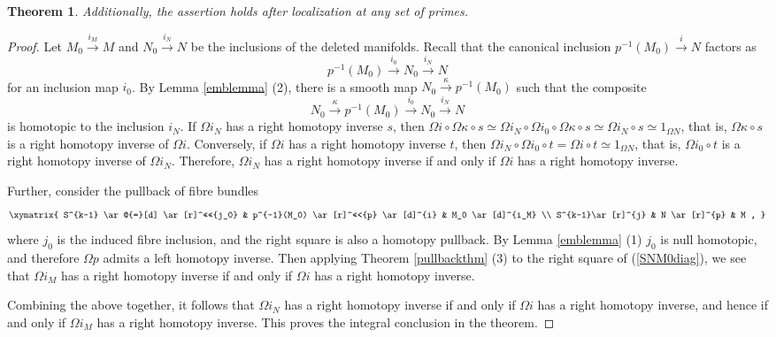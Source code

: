 \documentclass[a4]{amsart}
\newtheorem{theorem}{Theorem}[section]
\theoremstyle{definition}
\begin{document}
\begin{sloppypar}
\begin{theorem}
Additionally, the assertion holds after localization at any set of primes.
\end{theorem}
\begin{proof}
Let $M_0\stackrel{i_M}{\longrightarrow} M$ and $N_0\stackrel{i_N}{\longrightarrow} N$ be the inclusions of the deleted manifolds. Recall that the canonical inclusion $p^{-1}(M_0)\stackrel{i}{\longrightarrow} N$ factors as
\[
p^{-1}(M_0)\stackrel{i_0}{\longrightarrow} N_0 \stackrel{i_N}{\longrightarrow} N
\]
for an inclusion map $i_0$. 
By Lemma \ref{emblemma} (2), there is a smooth map $N_0\stackrel{\kappa}{\longrightarrow} p^{-1}(M_0)$ such that the composite 
\[
N_0\stackrel{\kappa}{\longrightarrow} p^{-1}(M_0)\stackrel{i_0}{\longrightarrow} N_0 \stackrel{i_N}{\longrightarrow} N
\] 
is homotopic to the inclusion $i_N$. If $\Omega i_N$ has a right homotopy inverse $s$, then $\Omega i\circ \Omega  \kappa\circ s\simeq \Omega i_N\circ \Omega i_0 \circ \Omega \kappa\circ s\simeq \Omega i_N\circ s\simeq 1_{\Omega N}$, that is, $\Omega\kappa\circ s$ is a right homotopy inverse of $\Omega i$. Conversely, if $\Omega i$ has a right homotopy inverse $t$, then $\Omega i_N\circ \Omega i_0 \circ t= \Omega i\circ t\simeq 1_{\Omega N}$, that is, $\Omega i_0\circ t$ is a right homotopy inverse of $\Omega i_N$. Therefore, $\Omega i_N$ has a right homotopy inverse if and only if $\Omega i$ has a right homotopy inverse. 


Further, consider the pullback of fibre bundles
\begin{equation}\label{SNM0diag}
\begin{aligned}
\xymatrix{
S^{k-1} \ar@{=}[d] \ar[r]^<<<<{j_0} & p^{-1}(M_0) \ar[r]^<<<{p} \ar[d]^{i} & M_0 \ar[d]^{i_M} \\ 
S^{k-1}\ar[r]^{j}                   &            N               \ar[r]^{p}    &  M ,                
}
\end{aligned}
\end{equation}
where $j_0$ is the induced fibre inclusion, and the right square is also a homotopy pullback. By Lemma \ref{emblemma} (1) $j_0$ is null homotopic, and therefore $\Omega p$ admits a left homotopy inverse. Then applying Theorem \ref{pullbackthm} (3) to the right square of (\ref{SNM0diag}), we see that $\Omega i_M$ has a right homotopy inverse if and only if $\Omega i$ has a right homotopy inverse.

Combining the above together, it follows that $\Omega i_N$ has a right homotopy inverse if and only if $\Omega i$ has a right homotopy inverse, and hence if and only if $\Omega i_M$ has a right homotopy inverse. This proves the integral conclusion in the theorem. 


\end{proof}
\end{sloppypar}
\end{document}
